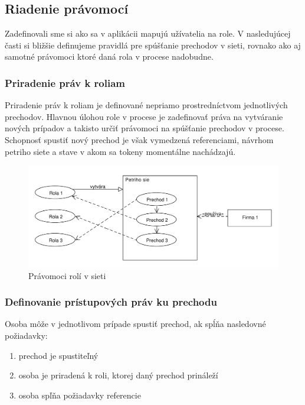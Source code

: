 	
	\subsection{Riadenie právomocí}	
	Zadefinovali sme si ako sa v aplikácii mapujú užívatelia na role. V nasledujúcej časti si bližšie definujeme pravidlá pre spúšťanie prechodov v sieti, rovnako ako aj samotné právomoci ktoré daná rola v procese nadobudne. 
	


	\subsubsection{Priradenie práv k roliam}
	Priradenie práv k roliam je definované nepriamo prostredníctvom jednotlivých prechodov. Hlavnou úlohou role v procese je zadefinovať práva na vytváranie nových prípadov a takisto určiť právomoci na spúšťanie prechodov v procese. Schopnosť spustiť nový prechod je však vymedzená referenciami, návrhom petriho siete a stave v akom sa tokeny momentálne nachádzajú.  

	
		\begin{figure}[h]
			\centering
			\includegraphics[width=0.9\linewidth]{images/roles_permissions}
			\caption{ Právomoci rolí v sieti }
			\label{fig:roles_permissions}
		\end{figure}
		
	\subsubsection{Definovanie prístupových práv ku prechodu}

	Osoba môže v jednotlivom prípade spustiť prechod, ak spĺňa nasledovné požiadavky:
	\begin{enumerate}
		\item prechod je spustiteľný
		\item osoba je priradená k roli, ktorej daný prechod prináleží
		\item osoba spľňa požiadavky referencie
	\end{enumerate}
	
